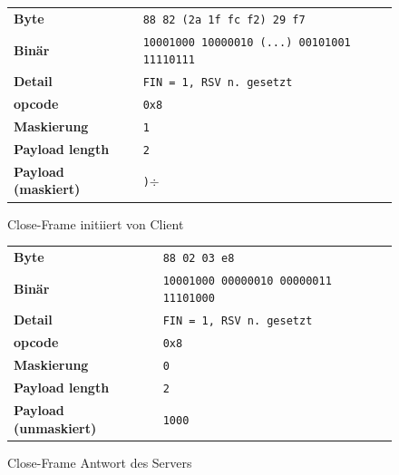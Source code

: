 \documentclass[11pt,a4paper,titlepage]{scrartcl}
\numberwithin{equation}{section}
\begin{document}
\begin{figure}[ht]
	\begin{center}
		\begin{tabular}{l>{\arraybackslash}p{9.0cm}}
			\textbf{Byte} & \texttt{88 82 (2a 1f fc f2) 29 f7}  \\
			\textbf{Binär} & \texttt{10001000 10000010 (...) 00101001 11110111}\\
			\textbf{Detail} & \texttt{FIN = 1, RSV n. gesetzt} \\
			\textbf{opcode} & \texttt{0x8} \\ 
			\textbf{Maskierung} & \texttt{1}\\ 
			\textbf{Payload length} & \texttt{2}\\ 
			\textbf{Payload (maskiert)} & \texttt{)$\div$}\\
		\end{tabular}
	\end{center}
	\caption{Close-Frame initiiert von Client}
	\label{fig:wsCloseFrameClient}
\end{figure}

\begin{figure}[ht]
	\begin{center}
		\begin{tabular}{l>{\arraybackslash}p{8.0cm}}
			\textbf{Byte} & \texttt{88 02 03 e8} \\
			\textbf{Binär} & \texttt{10001000 00000010 00000011 11101000}\\
			\textbf{Detail} & \texttt{FIN = 1, RSV n. gesetzt} \\
			\textbf{opcode} & \texttt{0x8} \\ 
			\textbf{Maskierung} & \texttt{0}\\ 
			\textbf{Payload length} & \texttt{2}\\ 
			\textbf{Payload (unmaskiert)} & \texttt{1000} \\
		\end{tabular}
	\end{center}
	\caption{Close-Frame Antwort des Servers}
	\label{fig:wsCloseFrameServer}
\end{figure}
\end{document}
